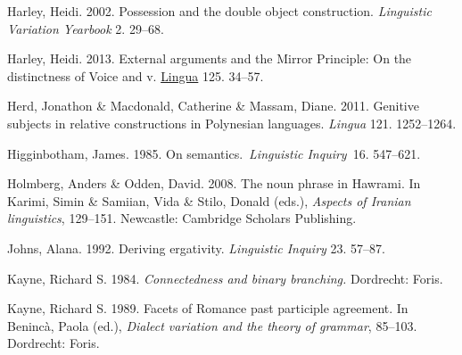 \documentclass[output=paper]{langsci/langscibook}
\begin{document}
\begin{styleSfondomedioiColorexi}
Harley, Heidi. 2002. Possession and the double object construction. \textit{Linguistic Variation Yearbook} 2. 29–68. 
\end{styleSfondomedioiColorexi}

\begin{styleSfondomedioiColorexi}
Harley, Heidi. 2013. External arguments and the Mirror Principle: On the distinctness of Voice and v. \href{http://www.sciencedirect.com/science/journal/00243841}{Lingua} 125. 34–57.
\end{styleSfondomedioiColorexi}

\begin{styleSfondomedioiColorexi}
Herd, Jonathon \& Macdonald, Catherine \& Massam, Diane. 2011. Genitive subjects in relative constructions in Polynesian languages. \textit{Lingua} 121. 1252–1264.
\end{styleSfondomedioiColorexi}

\begin{styleSfondomedioiColorexi}
Higginbotham, James. 1985. On semantics.~\textit{Linguistic Inquiry~}16. 547–621.
\end{styleSfondomedioiColorexi}

\begin{styleSfondomedioiColorexi}
Holmberg, Anders \& Odden, David. 2008. The noun phrase in Hawrami. In Karimi, Simin \& Samiian, Vida \& Stilo, Donald (eds.), \textit{Aspects of Iranian linguistics}, 129–151. Newcastle: Cambridge Scholars Publishing.
\end{styleSfondomedioiColorexi}

\begin{styleSfondomedioiColorexi}
Johns, Alana. 1992. Deriving ergativity. \textit{Linguistic Inquiry} 23. 57–87. 
\end{styleSfondomedioiColorexi}

\begin{styleSfondomedioiColorexi}
Kayne, Richard S. 1984. \textit{Connectedness and binary branching.} Dordrecht: Foris.
\end{styleSfondomedioiColorexi}

\begin{styleSfondomedioiColorexi}
Kayne, Richard S. 1989. Facets of Romance past participle agreement. In Benincà, Paola (ed.), \textit{Dialect variation and the theory of grammar}, 85–103. Dordrecht: Foris.
\end{styleSfondomedioiColorexi}
\end{document}
